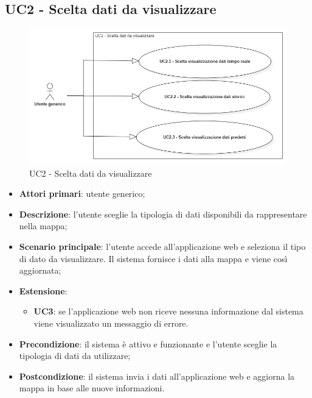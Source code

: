 \subsection{UC2 - Scelta dati da visualizzare}
\begin{center}
	\begin{figure}[H]
		\includegraphics[width=0.95\linewidth]{../immagini/attori_casi/uc2_1_2_3.png}
		\caption{UC2 - Scelta dati da visualizzare}
	\end{figure}
\end{center}

\begin{itemize}
	\item \textbf{Attori primari}: utente generico;
	\item \textbf{Descrizione}: l'utente sceglie la tipologia di dati disponibili da rappresentare nella mappa;
	\item \textbf{Scenario principale}: l'utente accede all'applicazione web e seleziona il tipo di dato da visualizzare. Il sistema fornisce i dati alla mappa e viene così aggiornata;
	\item \textbf{Estensione}: 
	\begin{itemize}
		\item \textbf{UC3}: se l'applicazione web non riceve nessuna informazione dal sistema viene visualizzato un messaggio di errore.
	\end{itemize}
	\item \textbf{Precondizione}: il sistema è attivo e funzionante e l'utente sceglie la tipologia di dati da utilizzare;
	\item \textbf{Postcondizione}: il sistema invia i dati all'applicazione web e aggiorna la mappa in base alle nuove informazioni.
\end{itemize}


